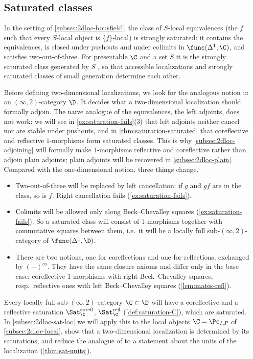 \subsection{Saturated classes}
\label{subsec:2dloc-saturation}

In the setting of \cref{subsec:2dloc-bousfield}, the class of $S$-local equivalences (the $f$ such that every $S$-local object is $\{f\}$-local) is strongly saturated: it contains the equivalences, is closed under pushouts and under colimits in $\func(\Delta^{1},\C)$, and satisfies two-out-of-three. For presentable $\C$ and a set $S$ it is the strongly saturated class generated by $S$ \cite[5.5.4.15]{htt}, so that accessible localizations and strongly saturated classes of small generation determine each other.

Before defining two-dimensional localizations, we look for the analogous notion in an $(\infty,2)$-category $\D$. It decides what a two-dimensional localization should formally adjoin. The naive analogue of the equivalences, the left adjoints, does not work: we will see in \cref{ex:saturation-fails}(3) that left adjoints neither cancel nor are stable under pushouts, and in \cref{thm:saturation-saturated} that coreflective and reflective $1$-morphisms form saturated classes. This is why \cref{subsec:2dloc-adjoining} will formally make $1$-morphisms reflective and coreflective rather than adjoin plain adjoints; plain adjoints will be recovered in \cref{subsec:2dloc-plain}.
Compared with the one-dimensional notion, three things change.
\begin{itemize}
\item Two-out-of-three will be replaced by left cancellation: if $g$ and $gf$ are in the class, so is $f$. Right cancellation fails (\cref{ex:saturation-fails}).
\item Colimits will be allowed only along Beck--Chevalley squares (\cref{ex:saturation-fails}). So a saturated class will consist of $1$-morphisms together with commutative squares between them, i.e.\ it will be a locally full sub-$(\infty,2)$-category of $\func(\Delta^{1},\D)$.
\item There are two notions, one for coreflections and one for reflections, exchanged by $(-)^{\mathrm{co}}$. They have the same closure axioms and differ only in the base case: coreflective $1$-morphisms with right Beck--Chevalley squares, resp.\ reflective ones with left Beck--Chevalley squares (\cref{lem:mates-refl}).
\end{itemize}
Every locally full sub-$(\infty,2)$-category $\C \subset \D$ will have a coreflective and a reflective saturation $\Sat^{\mathrm{corefl}}_{\C}$, $\Sat^{\mathrm{refl}}_{\C}$ (\cref{def:saturation-C}), which are saturated. In \cref{subsec:2dloc-sat-loc} we will apply this to the local objects $\C = \Pc_{I,P}$ of \cref{subsec:2dloc-local}, show that a two-dimensional localization is determined by its saturations, and reduce the analogue of \cite[5.5.4.15]{htt} to a statement about the units of the localization (\cref{thm:sat-units}).

